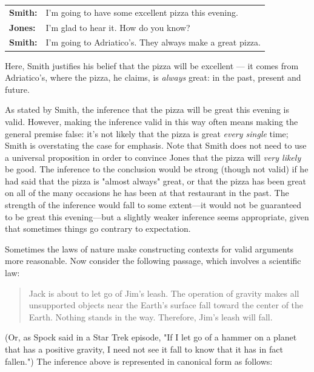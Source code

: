 \begin{adjustwidth}{2em}{0em}
\begin{longtabu}{p{.1\linewidth}p{.8\linewidth}}
\textbf{Smith:} & I'm going to have some excellent pizza this evening. \\
\textbf{Jones:} & I'm glad to hear it. How do you know?\\
\textbf{Smith:} & I'm going to Adriatico's. They always make a great pizza. \\
\end{longtabu}
\end{adjustwidth}
\vspace{-1cm}

Here, Smith justifies his belief that the pizza will be excellent --- it comes from Adriatico's, where the pizza, he claims, is \textit{always }great: in the past, present and future. 

As stated by Smith, the inference that the pizza will be great this evening is valid. However, making the inference valid in this way often means making the general premise false: it's not likely that the pizza is great \textit{every single }time; Smith is overstating the case for emphasis. Note that Smith does not need to use a universal proposition in order to convince Jones that the pizza will \textit{very likely} be good. The inference to the conclusion would be strong (though not valid) if he had said that the pizza is "almost always" great, or that the pizza has been great on all of the many occasions he has been at that restaurant in the past. The strength of the inference would fall to some extent---it would not be guaranteed to be great this evening---but a slightly weaker inference seems appropriate, given that sometimes things go contrary to expectation. 

Sometimes the laws of nature make constructing contexts for valid arguments more reasonable. Now consider the following passage, which involves a scientific law:

\begin{quotation}\noindent Jack is about to let go of Jim's leash. The operation of gravity makes all unsupported objects near the Earth's surface fall toward the center of the Earth. Nothing stands in the way. Therefore, Jim's leash will fall. \end{quotation}

(Or, as Spock said in a Star Trek episode, "If I let go of a hammer on a planet that has a positive gravity, I need not see it fall to know that it has in fact fallen.") The inference above is represented in canonical form as follows:


